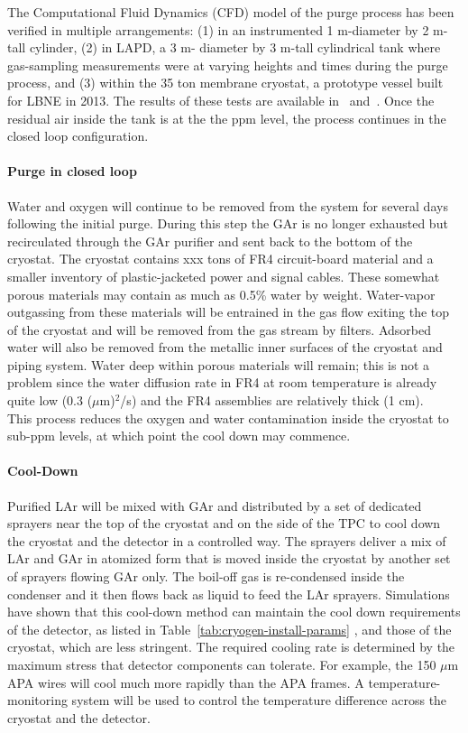 The Computational Fluid Dynamics (CFD) model of the purge process has been verified in multiple arrangements: (1) in an instrumented 1 m-diameter by 2 m-tall cylinder, (2) in LAPD, a 3 m- diameter by 3 m-tall cylindrical tank where gas-sampling measurements were at varying heights and times during the purge process, and (3) within the 35 ton membrane cryostat, a prototype vessel built for LBNE in 2013. The results of these tests are available in~\cite{lar1-nd-35-ton-talk} and~\cite{CFD_verification-lapd}. 
%
Once the residual air inside the tank is at the the ppm level, the process continues in the closed loop configuration. 

\paragraph{Purge in closed loop}

Water and oxygen will continue to be removed from the system for several days following the initial purge. During this step the GAr is no longer exhausted but recirculated through the GAr purifier and sent back to the bottom of the cryostat. The cryostat contains xxx  tons of FR4 circuit-board material and a smaller inventory of plastic-jacketed power and signal cables. These somewhat porous materials may contain as much as 0.5\% water by weight. Water-vapor outgassing from these materials will be entrained in the gas flow exiting the top of the cryostat and will be removed from the gas stream by filters. Adsorbed water will also be removed from the metallic inner surfaces of the cryostat and piping system. Water deep within porous materials will remain; this is not a problem since the water diffusion rate in FR4 at room temperature is already quite low (0.3 ($\mu$m)$^2$/s) and the FR4 assemblies are relatively thick (1 cm).\\
%
This process reduces the oxygen and water contamination inside the cryostat to sub-ppm levels, at which point the cool down may commence.

\paragraph{Cool-Down}

Purified LAr will be mixed with GAr and distributed by a set of dedicated sprayers near the top of the cryostat and on the side of the TPC to cool down the cryostat and the detector in a controlled way. The sprayers deliver a mix of LAr and GAr in atomized form that is moved inside the cryostat by another set of sprayers flowing GAr only. The boil-off gas is re-condensed inside the condenser and it then flows back as liquid to feed the LAr sprayers. Simulations have shown that this cool-down method can maintain the cool down requirements of the detector, as listed in Table~\ref{tab:cryogen-install-params} , and those of the cryostat, which are less stringent. The required cooling rate is determined by the maximum stress that detector components can tolerate. For example, the 150 $\mu$m APA wires will cool much more rapidly than the APA frames. A temperature-monitoring system will be used to control the temperature difference across the cryostat and the detector.

